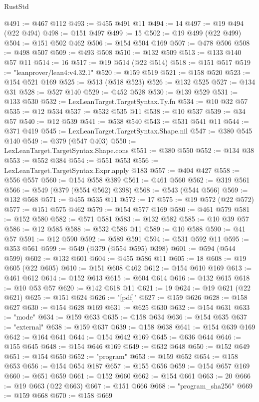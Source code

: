 \begin{lexlean}{RustStd}
\begin{coremodule}
@491 := @467 @112
@493 := @455 @491 @11
@494 := 14
@497 := @19 @494 (@22 @494)
@498 := @151 @497
@499 := 15
@502 := @19 @499 (@22 @499)
@504 := @151 @502 @462
@506 := @154 @504 @169
@507 := @478 @506
@508 := @498 @507
@509 := @493 @508
@510 := @132 @509
@513 := @133 @140 @57 @11
@514 := 16
@517 := @19 @514 (@22 @514)
@518 := @151 @517
@519 := "leanprover/lean4:v4.32.1"
@520 := @159 @519
@521 := @158 @520
@523 := @154 @521 @169
@525 := @513 (@518 @523)
@526 := @132 @525
@527 := @134 @31
@528 := @527 @140
@529 := @452 @528
@530 := @139 @529
@531 := @133 @530
@532 := LexLeanTarget.TargetSyntax.Ty.fn
@534 := @10 @32 @57
@535 := @12 @534
@537 := @532 @535 @11
@538 := @10 @537
@539 := @34 @57
@540 := @12 @539
@541 := @538 @540
@543 := @531 @541 @11
@544 := @371 @419
@545 := LexLeanTarget.TargetSyntax.Shape.nil
@547 := @380 @545 @140
@549 := @379 (@547 @403)
@550 := LexLeanTarget.TargetSyntax.Shape.cons
@551 := @380 @550
@552 := @134 @38
@553 := @552 @384
@554 := @551 @553
@556 := LexLeanTarget.TargetSyntax.Expr.apply @183
@557 := @404 @427
@558 := @556 @557
@560 := @154 @558 @389
@561 := @461 @560
@562 := @319 @561
@566 := @549 (@379 (@554 @562) @398)
@568 := @543 (@544 @566)
@569 := @132 @568
@571 := @455 @535 @11
@572 := 17
@575 := @19 @572 (@22 @572)
@577 := @151 @575 @462
@579 := @154 @577 @169
@580 := @461 @579
@581 := @152 @580
@582 := @571 @581
@583 := @132 @582
@585 := @10 @39 @57
@586 := @12 @585
@588 := @532 @586 @11
@589 := @10 @588
@590 := @41 @57
@591 := @12 @590
@592 := @589 @591
@594 := @531 @592 @11
@595 := @353 @561
@599 := @549 (@379 (@554 @595) @398)
@601 := @594 (@544 @599)
@602 := @132 @601
@604 := @455 @586 @11
@605 := 18
@608 := @19 @605 (@22 @605)
@610 := @151 @608 @462
@612 := @154 @610 @169
@613 := @461 @612
@614 := @152 @613
@615 := @604 @614
@616 := @132 @615
@618 := @10 @53 @57
@620 := @142 @618 @11
@621 := 19
@624 := @19 @621 (@22 @621)
@625 := @151 @624
@626 := "[pdf]"
@627 := @159 @626
@628 := @158 @627
@630 := @154 @628 @169
@631 := @625 @630
@632 := @154 @631
@633 := "mode"
@634 := @159 @633
@635 := @158 @634
@636 := @154 @635
@637 := "external"
@638 := @159 @637
@639 := @158 @638
@641 := @154 @639 @169
@642 := @164 @641
@644 := @154 @642 @169
@645 := @636 @644
@646 := @155 @645
@648 := @154 @646 @169
@649 := @632 @648
@650 := @152 @649
@651 := @154 @650
@652 := "program"
@653 := @159 @652
@654 := @158 @653
@656 := @154 @654 @187
@657 := @155 @656
@659 := @154 @657 @169
@660 := @651 @659
@661 := @152 @660
@662 := @154 @661
@663 := 20
@666 := @19 @663 (@22 @663)
@667 := @151 @666
@668 := "program_sha256"
@669 := @159 @668
@670 := @158 @669

\end{coremodule}
\end{lexlean}
